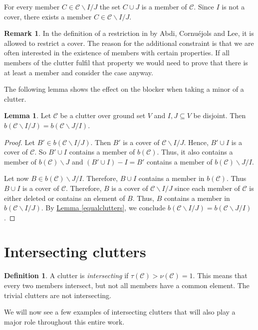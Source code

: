 \documentclass[a4paper, 12pt]{scrbook}
\theoremstyle{definition}
\newtheorem*{definition}{Definition}
\newtheorem*{remark}{Remark}
\newtheorem{lemma}[theorem]{Lemma}
\begin{document}
For every member $C \in \mathcal{C} \backslash I /J$ the set $C \cup J$ is a member of $\mathcal{C}$.
Since $I$ is not a cover, there exists a member $C \in \mathcal{C} \backslash I /J$.

\begin{remark}
    In the definition of a restriction in \cite{restrictions} by Abdi, Cornuéjols and Lee, it is allowed to restrict a cover.
    The reason for the additional constraint is that we are often interested in the existence of members with certain properties.
    If all members of the clutter fulfil that property we would need to prove that there is at least a member and consider the case anyway.
\end{remark}

The following lemma shows the effect on the blocker when taking a minor of a clutter.
\begin{lemma}
    Let $\mathcal{C}$ be a clutter over ground set $V$ and $I,J \subseteq V$ be disjoint.
    Then $b(\mathcal{C}\backslash I /J) = b(\mathcal{C} \backslash J / I)$.
\end{lemma}

\begin{proof}
    Let $B' \in b(\mathcal{C}\backslash I /J)$. Then $B'$ is a cover of $\mathcal{C}\backslash I /J$.
    Hence, $B' \cup I$ is a cover of $\mathcal{C}$.
    So $B' \cup I$ contains a member of $b(\mathcal{C})$. Thus, it also contains a member of $b(\mathcal{C})\backslash J$ and $(B' \cup I)-I=B'$ contains a member of $b(\mathcal{C})\backslash J /I$.

    Let now $B \in b(\mathcal{C})\backslash J/I$. Therefore, $B \cup I$ contains a member in $b(\mathcal{C})$. Thus $B \cup I$ is a cover of $\mathcal{C}$. Therefore, $B$ is a cover of $\mathcal{C}\backslash I /J$ since each member of $\mathcal{C}$ is either deleted or contains an element of $B$. Thus, $B$ contains a member in $b(\mathcal{C}\backslash I /J)$.
    By \hyperref[equalclutters]{Lemma \ref*{equalclutters}}, we conclude $b(\mathcal{C}\backslash I /J) = b(\mathcal{C} \backslash J / I)$.
\end{proof}


\section{Intersecting clutters}
\begin{definition}
    A clutter is \emph{intersecting} if $\tau(\mathcal{C}) > \nu(\mathcal{C}) = 1$. This means that every two members intersect, but not all members have a common element.
    The trivial clutters are not intersecting.
\end{definition}
We will now see a few examples of intersecting clutters that will also play a major role throughout this entire work.
\end{document}
